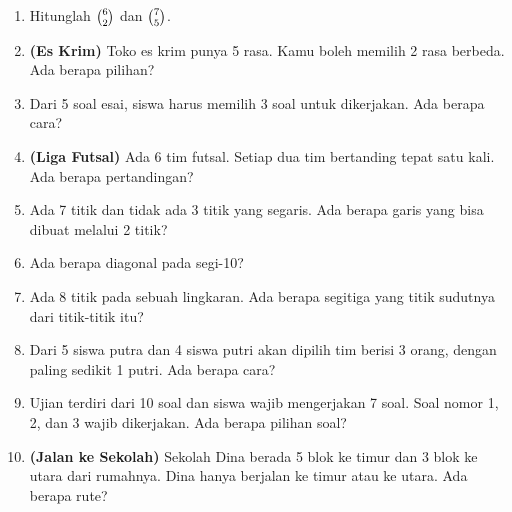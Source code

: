 \documentclass[11pt,a4paper]{article}
\begin{document}
\begin{enumerate}
  \item Hitunglah $\binom{6}{2}$ dan $\binom{7}{5}$.
  \item \textbf{(Es Krim)} Toko es krim punya 5 rasa. Kamu boleh memilih 2 rasa berbeda.
        Ada berapa pilihan?
  \item Dari 5 soal esai, siswa harus memilih 3 soal untuk dikerjakan. Ada berapa cara?
  \item \textbf{(Liga Futsal)} Ada 6 tim futsal. Setiap dua tim bertanding tepat satu kali.
        Ada berapa pertandingan?
  \item Ada 7 titik dan tidak ada 3 titik yang segaris. Ada berapa garis yang bisa dibuat
        melalui 2 titik?
\end{enumerate}

\begin{enumerate}
  \setcounter{enumi}{5}
  \item Ada berapa diagonal pada segi-10?
  \item Ada 8 titik pada sebuah lingkaran. Ada berapa segitiga yang titik sudutnya dari
        titik-titik itu?
  \item Dari 5 siswa putra dan 4 siswa putri akan dipilih tim berisi 3 orang, dengan paling
        sedikit 1 putri. Ada berapa cara?
  \item Ujian terdiri dari 10 soal dan siswa wajib mengerjakan 7 soal. Soal nomor 1, 2, dan 3
        wajib dikerjakan. Ada berapa pilihan soal?
  \item \textbf{(Jalan ke Sekolah)} Sekolah Dina berada 5 blok ke timur dan 3 blok ke utara
        dari rumahnya. Dina hanya berjalan ke timur atau ke utara. Ada berapa rute?
\end{enumerate}
\end{document}
